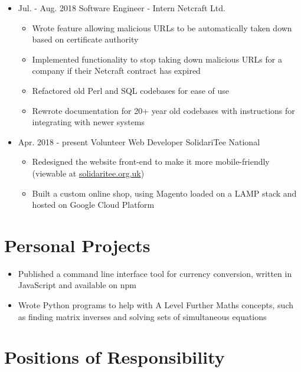 \documentclass[11pt,a4paper,sans]{moderncv}        %
\begin{document}
\begin{itemize}

\item{
\cventry
{Jul. - Aug. 2018}
{Software Engineer - Intern}
{Netcraft Ltd.}
{}{}{
\begin{itemize}
\item Wrote feature allowing malicious URLs to be automatically taken down based on certificate authority
\item Implemented functionality to stop taking down malicious URLs for a company if their Netcraft contract has expired
\item Refactored old Perl and SQL codebases for ease of use
\item Rewrote documentation for 20+ year old codebases with instructions for integrating with newer systems
\end{itemize}
}}

\item{
\cventry
{Apr. 2018 - present}
{Volunteer Web Developer}
{SolidariTee National}
{}{}{
\begin{itemize}
\item Redesigned the website front-end to make it more mobile-friendly (viewable at \href{https://www.solidaritee.org.uk/}{solidaritee.org.uk})
\item Built a custom online shop, using Magento loaded on a LAMP stack and hosted on Google Cloud Platform
\end{itemize}
}}

\end{itemize}

\section{Personal Projects}

\begin{itemize}

\item Published a command line interface tool for currency conversion, written in JavaScript and available on npm

\item Wrote Python programs to help with A Level Further Maths concepts, such as finding matrix inverses and solving sets of simultaneous equations

\end{itemize}

\section{Positions of Responsibility}
\end{document}
